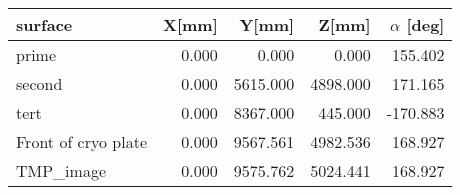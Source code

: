 \begin{tabular}{lrrrr}
\toprule
            surface &  X[mm] &    Y[mm] &    Z[mm] &  $\alpha$ [deg] \\
\midrule
              prime &  0.000 &    0.000 &    0.000 &      155.402 \\
             second &  0.000 & 5615.000 & 4898.000 &      171.165 \\
               tert &  0.000 & 8367.000 &  445.000 &     -170.883 \\
Front of cryo plate &  0.000 & 9567.561 & 4982.536 &      168.927 \\
          TMP\_image &  0.000 & 9575.762 & 5024.441 &      168.927 \\
\bottomrule
\end{tabular}
